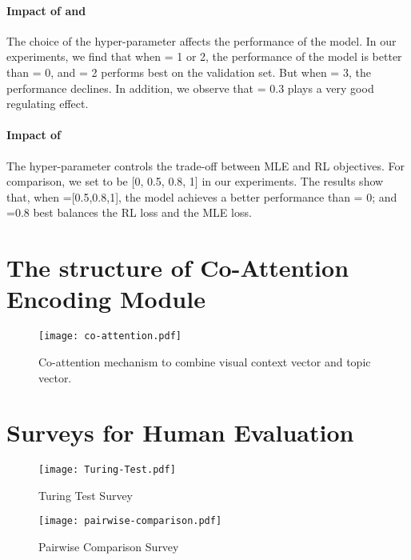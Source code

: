 \documentclass[11pt]{article}
\begin{document}
\paragraph{Impact of  and } The choice of the hyper-parameter  affects the performance of the model. In our experiments, we find that when  = 1 or 2, the performance of the model is better than  = 0, and  = 2 performs best on the validation set. But when  = 3, the performance declines. In addition, we observe that  = 0.3 plays a very good regulating effect.

\paragraph{Impact of }
The hyper-parameter  controls the trade-off between MLE and RL objectives. For comparison, we set  to be [0, 0.5, 0.8, 1] in our experiments. The results show that, when  =[0.5,0.8,1], the model achieves a better performance than  = 0; and  =0.8 best balances the RL loss and the MLE loss. 

\section{The structure of Co-Attention Encoding Module}

\begin{figure}[h]
\begin{center}
\texttt{[image: co-attention.pdf]}  
\end{center}
  \caption{Co-attention mechanism to combine visual context vector and topic vector.}
  \label{fig:co-attention}
\end{figure}

\section{Surveys for Human Evaluation}

\begin{figure}
	\centering
	\texttt{[image: Turing-Test.pdf]} 
	\caption{Turing Test Survey}
	\label{fig:turing-test}
\end{figure}

\begin{figure}
	\centering
	\texttt{[image: pairwise-comparison.pdf]} 
	\caption{Pairwise Comparison Survey}
	\label{fig:pairwise-comparison}
\end{figure}
\end{document}
